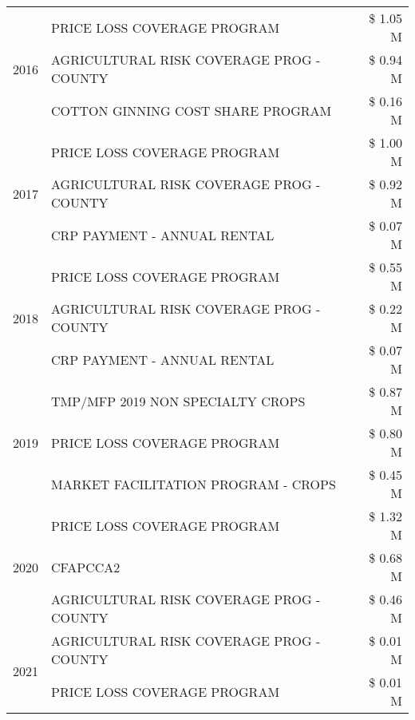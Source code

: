 \begin{tabular}{llr}
\multirow[t]{3}{*}{2016} & PRICE LOSS COVERAGE PROGRAM & \$ 1.05 M \\
 & AGRICULTURAL RISK COVERAGE PROG - COUNTY & \$ 0.94 M \\
 & COTTON GINNING COST SHARE PROGRAM & \$ 0.16 M \\
\cline{1-3}
\multirow[t]{3}{*}{2017} & PRICE LOSS COVERAGE PROGRAM & \$ 1.00 M \\
 & AGRICULTURAL RISK COVERAGE PROG - COUNTY & \$ 0.92 M \\
 & CRP PAYMENT - ANNUAL RENTAL & \$ 0.07 M \\
\cline{1-3}
\multirow[t]{3}{*}{2018} & PRICE LOSS COVERAGE PROGRAM & \$ 0.55 M \\
 & AGRICULTURAL RISK COVERAGE PROG - COUNTY & \$ 0.22 M \\
 & CRP PAYMENT - ANNUAL RENTAL & \$ 0.07 M \\
\cline{1-3}
\multirow[t]{3}{*}{2019} & TMP/MFP 2019 NON SPECIALTY CROPS & \$ 0.87 M \\
 & PRICE LOSS COVERAGE PROGRAM & \$ 0.80 M \\
 & MARKET FACILITATION PROGRAM - CROPS & \$ 0.45 M \\
\cline{1-3}
\multirow[t]{3}{*}{2020} & PRICE LOSS COVERAGE PROGRAM & \$ 1.32 M \\
 & CFAPCCA2 & \$ 0.68 M \\
 & AGRICULTURAL RISK COVERAGE PROG - COUNTY & \$ 0.46 M \\
\cline{1-3}
\multirow[t]{2}{*}{2021} & AGRICULTURAL RISK COVERAGE PROG - COUNTY & \$ 0.01 M \\
 & PRICE LOSS COVERAGE PROGRAM & \$ 0.01 M \\
\cline{1-3}
\bottomrule
\end{tabular}

